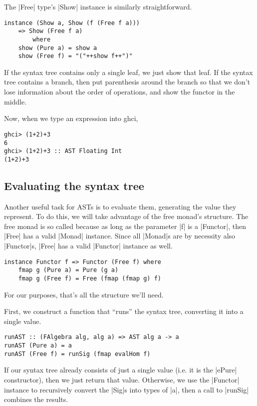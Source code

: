 \documentclass[preprint]{sigplanconf}
\theoremstyle{definition}
\begin{document}
The |Free| type's |Show| instance is similarly straightforward.
\begin{lstlisting}
instance (Show a, Show (f (Free f a)))
    => Show (Free f a)
        where
    show (Pure a) = show a
    show (Free f) = "("++show f++")"
\end{lstlisting}
If the syntax tree contains only a single leaf, we just show that leaf.
If the syntax tree contains a branch,
then put parenthesis around the branch so that we don't lose information about the order of operations, and show the functor in the middle.

Now, when we type an expression into ghci,
\begin{lstlisting}
ghci> (1+2)+3
6
ghci> (1+2)+3 :: AST Floating Int
(1+2)+3
\end{lstlisting}

\subsection{Evaluating the syntax tree}
Another useful task for ASTs is to evaluate them,
generating the value they represent.
To do this, we will take advantage of the free monad's structure.
The free monad is so called because as long as the parameter |f| is a |Functor|,
then |Free| has a valid |Monad| instance.
Since all |Monad|s are by necessity also |Functor|s,
|Free| has a valid |Functor| instance as well.
\begin{lstlisting}
instance Functor f => Functor (Free f) where
    fmap g (Pure a) = Pure (g a)
    fmap g (Free f) = Free (fmap (fmap g) f)
\end{lstlisting}
For our purposes, that's all the structure we'll need.

First, we construct a function that ``runs'' the syntax tree, converting it into a single value.
\begin{lstlisting}
runAST :: (FAlgebra alg, alg a) => AST alg a -> a
runAST (Pure a) = a
runAST (Free f) = runSig (fmap evalHom f)
\end{lstlisting}
If our syntax tree already consists of just a single value (i.e. it is the |ePure| constructor),
then we just return that value.
Otherwise, we use the |Functor| instance to recursively convert the |Sig|s into types of |a|, then a call to |runSig| combines the results.
\end{document}
